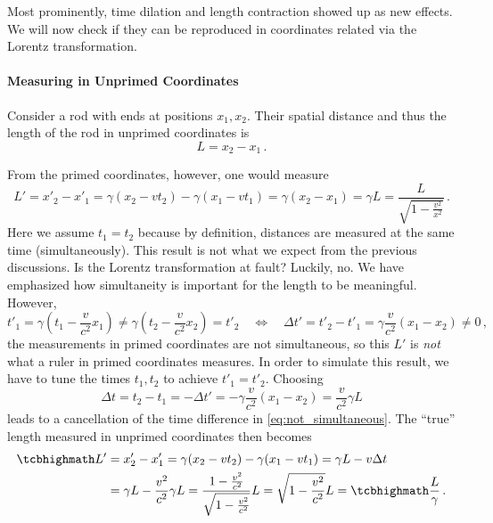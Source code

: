 Most prominently, time dilation and length contraction showed up as new effects. We will now check if they can be reproduced in coordinates related via the Lorentz transformation.



			\paragraph{Measuring in Unprimed Coordinates}
Consider a rod with ends at positions $x_1, x_2$. Their spatial distance and thus the length of the rod in unprimed coordinates is
\begin{equation*}
	L = x_2 - x_1 \, .
\end{equation*}

From the primed coordinates, however, one would measure
\begin{equation}\label{eq:length_contraction_not_correct}
	L' = x'_2 - x'_1 = \gamma (x_2 - v t_2) - \gamma (x_1 - v t_1) = \gamma (x_2 - x_1) = \gamma L = \frac{L}{\sqrt{1 - \frac{v^2}{x^2}}} \, .
\end{equation}
Here we assume $t_1 = t_2$ because by definition, distances are measured at the same time (simultaneously). This result is not what we expect from the previous discussions. Is the Lorentz transformation at fault? Luckily, no. We have emphasized how simultaneity is important for the length to be meaningful. However,
\begin{equation}\label{eq:not_simultaneous}
	t'_1 = \gamma (t_1 - \frac{v}{c^2} x_1) \neq \gamma (t_2 - \frac{v}{c^2} x_2) = t'_2
	\quad \Leftrightarrow \quad
	\Delta t' = t'_2 - t'_1 = \gamma \frac{v}{c^2} (x_1 - x_2) \neq 0
	\, ,
\end{equation}
the measurements in primed coordinates are not simultaneous, so this $L'$ is \emph{not} what a ruler in primed coordinates measures. In order to simulate this result, we have to tune the times $t_1, t_2$ to achieve $t'_1 = t'_2$. Choosing
\begin{equation}
	\Delta t = t_2 - t_1 = - \Delta t' = - \gamma \frac{v}{c^2} (x_1 - x_2) = \frac{v}{c^2} \gamma L
\end{equation}
leads to a cancellation of the time difference in \eqref{eq:not_simultaneous}. The \enquote{true} length measured in unprimed coordinates then becomes
\begin{equation}\label{eq:length_contraction_correct}
	\begin{split}
	\eqbox{L'} &= x'_2 - x'_1 = \gamma (x_2 - v t_2) - \gamma (x_1 - v t_1) = \gamma L - v \Delta t
	\\
	&= \gamma L - \frac{v^2}{c^2} \gamma L = \frac{1 - \frac{v^2}{c^2}}{\sqrt{1 - \frac{v^2}{c^2}}} L = \sqrt{1 - \frac{v^2}{c^2}} L = \eqbox{\frac{L}{\gamma}} \, .
	\end{split}
\end{equation}
